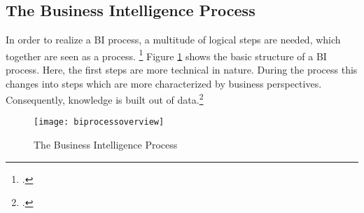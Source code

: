 \subsection{The Business Intelligence Process} \label{toc:prozess}

In order to realize a \ac{BI} process, a multitude of logical steps are needed, which together are seen as a process.
\footcite[Cf.][p. 3]{foley2010business} Figure \ref{figure:biprocessoverview} shows the basic structure of a \ac{BI} process.
Here, the first steps are more technical in nature. During the process this changes into steps
which are more characterized by business perspectives. Consequently, knowledge is
built out of data.\footcite[Cf.][p. 13]{kasemsap2016fundamentals}

\begin{figure}[H]
    \caption{The Business Intelligence Process}
    \texttt{[image: biprocessoverview]}
    \label{figure:biprocessoverview}
    \\
    \cite[Source: Based on][Fig. 2]{foley2010business}
\end{figure}

